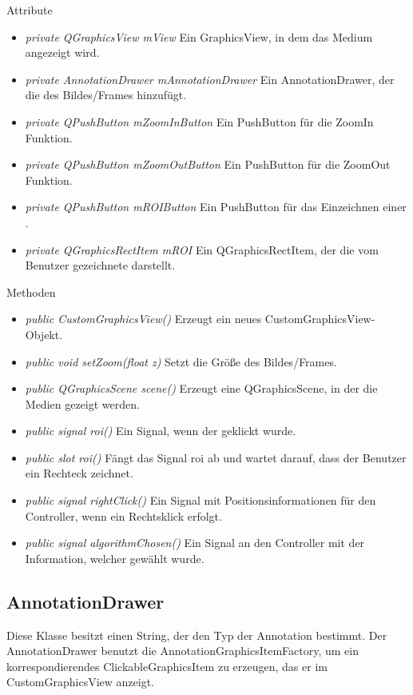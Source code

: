 Attribute
\begin{itemize}
	\item\textit{private QGraphicsView mView} 
	Ein GraphicsView, in dem das Medium angezeigt wird. 
	\item\textit{private AnnotationDrawer mAnnotationDrawer} 
	Ein AnnotationDrawer, der die  des Bildes/Frames hinzufügt. 
	\item\textit{private QPushButton mZoomInButton} 
	Ein PushButton für die ZoomIn Funktion. 
	\item\textit{private QPushButton mZoomOutButton} 
	Ein PushButton für die ZoomOut Funktion.
	\item\textit{private QPushButton mROIButton} 
	Ein PushButton für das Einzeichnen einer .
	\item\textit{private QGraphicsRectItem mROI} 
	Ein QGraphicsRectItem, der die vom Benutzer gezeichnete  darstellt.
\end{itemize}

Methoden
\begin{itemize}
	\item\textit{public CustomGraphicsView()} 
	Erzeugt ein neues CustomGraphicsView-Objekt.
	\item\textit{public void setZoom(float z)} 
	Setzt die Größe des Bildes/Frames.
	\item\textit{public QGraphicsScene scene()} 
	Erzeugt eine QGraphicsScene, in der die Medien gezeigt werden.
	\item\textit{public signal roi()} 
	Ein Signal, wenn der  geklickt wurde.
	\item\textit{public slot roi()} 
	Fängt das Signal roi ab und wartet darauf, dass der Benutzer ein Rechteck zeichnet.
	\item\textit{public signal rightClick()} 
	Ein Signal mit Positionsinformationen für den Controller, wenn ein Rechtsklick erfolgt. 
	\item\textit{public signal algorithmChosen()} 
	Ein Signal an den Controller mit der Information, welcher  gewählt wurde.
\end{itemize}

\subsection*{AnnotationDrawer}
Diese Klasse besitzt einen String, der den Typ der \gls{Annotation} bestimmt. Der AnnotationDrawer benutzt die AnnotationGraphicsItemFactory, um ein korrespondierendes ClickableGraphicsItem zu erzeugen, das er im CustomGraphicsView anzeigt.

